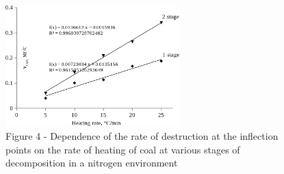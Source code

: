 \begin{figure}[H]
	\centering
	\includegraphics[width=0.6\textwidth]{assets/1088}
	\caption*{Figure 4 - Dependence of the rate of destruction at the inflection points on the rate of heating of coal at various stages of decomposition in a nitrogen environment}
\end{figure}

